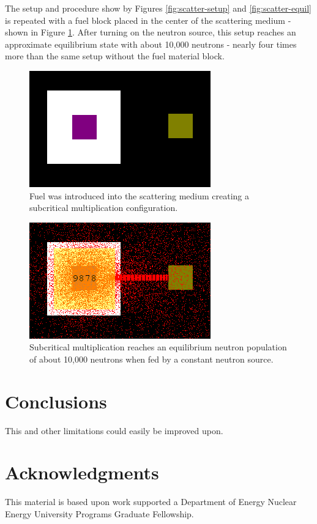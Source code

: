 \documentclass{anstrans}
\begin{document}
The setup and procedure show by Figures \ref{fig:scatter-setup} and
\ref{fig:scatter-equil} is repeated with a fuel block placed in the center of
the scattering medium - shown in Figure \ref{fig:subcrit-setup}.  After
turning on the neutron source, this setup reaches an approximate equilibrium
state with about 10,000 neutrons - nearly four times more than the same setup
without the fuel material block.

\begin{figure}
    \centering
    \includegraphics{subcrit-mult-setup.png}
    \caption{Fuel was introduced into the scattering medium creating a subcritical multiplication configuration.}
    \label{fig:subcrit-setup}
\end{figure}

\begin{figure}
    \centering
    \includegraphics{subcrit-mult-equil.png}
    \caption{Subcritical multiplication reaches an equilibrium neutron population of about 10,000 neutrons when fed by a constant neutron source.}
    \label{fig:subcrit-equil}
\end{figure}

\section{Conclusions}


This and other limitations could easily be improved upon.  

\section{Acknowledgments}
This material is based upon work supported a Department of Energy Nuclear
Energy University Programs Graduate Fellowship.



\end{document}
